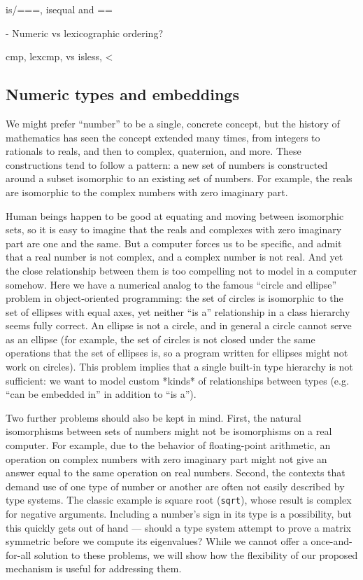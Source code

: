 is/===, isequal and ==

- Numeric vs lexicographic ordering?

cmp, lexcmp, vs isless, <

\subsection{Numeric types and embeddings}

We might prefer ``number'' to be a single,
concrete concept, but the history of mathematics has seen the concept
extended many times, from integers to rationals to reals, and then to complex,
quaternion, and more. These constructions tend to follow a pattern: a new set
of numbers is constructed around a subset isomorphic to an existing set of
numbers. For example, the reals are isomorphic to the complex numbers with
zero imaginary part.

Human beings happen to be good at equating and moving between isomorphic sets,
so it is easy to imagine that the reals and complexes with zero imaginary
part are one and the same. But a computer forces us to be specific, and admit
that a real number is not complex, and a complex number is not real. And yet
the close relationship between them is too compelling not to model in a
computer somehow. Here we have a numerical analog to the famous ``circle and
ellipse'' problem in object-oriented programming: the set of circles is
isomorphic to the set of ellipses with equal axes, yet neither ``is a''
relationship in a class hierarchy seems fully correct. An ellipse is not
a circle, and in general a circle cannot serve as an ellipse (for example,
the set of circles is not closed under the same operations that the set of
ellipses is, so a program written for ellipses might not work on circles).
This problem implies that a single built-in type hierarchy is not
sufficient: we want to model custom *kinds* of relationships between
types (e.g. ``can be embedded in'' in addition to ``is a'').

Two further problems should also be kept in mind. First, the natural isomorphisms
between sets of numbers might not be isomorphisms on a real computer. For example,
due to the behavior of floating-point arithmetic, an operation on complex numbers
with zero imaginary part might not give an answer equal to the same operation on
real numbers. Second, the contexts that demand use of one type of number or
another are often not easily described by type systems. The classic example is
square root (\texttt{sqrt}), whose result is complex for negative arguments.
Including a number's sign in its type is a possibility, but this quickly gets
out of hand --- should a type system attempt to prove a matrix symmetric before
we compute its eigenvalues? While we cannot offer a once-and-for-all solution
to these problems, we will show how the flexibility of our proposed mechanism
is useful for addressing them.


